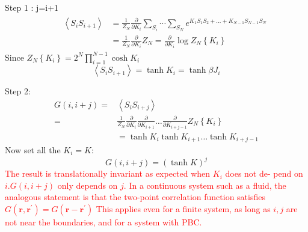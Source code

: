 \documentclass[12pt,titlepage]{article}
\numberwithin{equation}{section}
\begin{document}
Step  1 : j=i+1 
\begin{equation}
\begin{array}{l} {\qquad \begin{aligned}\left\langle S_{i} S_{i+1}\right\rangle &=\frac{1}{Z_{N}} \frac{\partial}{\partial K_{i}} \sum_{S_{i}} \cdots \sum_{S_{N}} e^{K_{1} S_{1} S_{2}+\ldots+K_{N-1} S_{N-1}S_{N}}  \\ &=\frac{1}{Z_{N}} \frac{\partial}{\partial K_{i}} Z_{N}=\frac{\partial}{\partial K_{i}} \log Z_{N}\left\{K_{i}\right\} \end{aligned}}\end{array}
\end{equation}
Since $Z_{N}\left\{K_{i}\right\}=2^{N} \prod_{i=1}^{N-1} \cosh K_{i}$
\begin{equation}
\left\langle S_{i} S_{i+1}\right\rangle=\tanh K_{i}=\tanh \beta J_{i}
\end{equation}

Step 2:
\begin{equation}
\begin{aligned} G(i, i+j)=&\left\langle S_{i} S_{i+j}\right\rangle \\=& \frac{1}{Z_{N}} \frac{\partial}{\partial K_{i}} \frac{\partial}{\partial K_{i+1}} \ldots \frac{\partial}{\partial K_{i+j-1}} Z_{N}\left\{K_{i}\right\} \\ &=\tanh K_{i} \tanh K_{i+1} \ldots \tanh K_{i+j-1} \end{aligned}
\end{equation}
Now set all the $K_{i}=K :$
\begin{equation}
G(i, i+j)=(\tanh K)^{j}
\end{equation}
\textcolor{red}{The result is translationally invariant as expected when $K_{i}$ does not de-
pend on $i . G(i, i+j)$ only depends on $j .$ In a continuous system such as a fluid, the analogous statement is that the two-point correlation function satisfies $G\left(\mathbf{r}, \mathbf{r}^{\prime}\right)=G\left(\mathbf{r}-\mathbf{r}^{\prime}\right)$ This applies even for a finite system, as long as $i,j$ are not near the boundaries, and for a system with PBC.}
\end{document}
